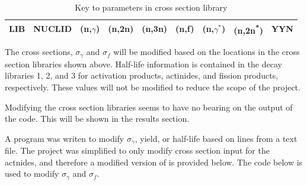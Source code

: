 \documentclass[11pt,notitlepage]{article}
\newcommand{\tss}{\textsuperscript}
\newcommand{\inputdeckpages}[4]{
\begin{itemize}
\item[]
\end{itemize}
}
\begin{document}
\begin{todolist}
  \begin{table}[H]
  \begin{center}
    \caption{Key to parameters in cross section library}
    \label{Table:2}
    \begin{tabular}{l l l l l l l l l}
      \toprule
      LIB & NUCLID & (n,$\gamma$) & (n,2n) & (n,3n) &
      (n,f) & (n,$\gamma^*$) & (n,2n\tss{*}) & YYN\\
      \bottomrule
    \end{tabular}
  \end{center}
  \end{table}

  The cross sections, $\sigma_\gamma$
  and $\sigma_f$ will be modified based on the
  locations in the cross section libraries shown above.
  Half-life information is contained in the decay
  libraries 1, 2, and 3 for activation products, actinides,
  and fission products, respectively. These values will
  not be modified to reduce the scope of the project.

  Modifying the cross section libraries seems to have
  no bearing on the output of the code. This will be shown
  in the results section.

  


  A program was writen to modify $\sigma_\gamma$, yield,
  or half-life based on lines from a text file. The project was
  simplified to only modify cross section input for the actnides,
  and therefore a modified version of is provided below. The code
  below is used to modify $\sigma_\gamma$ and $\sigma_f$.


\end{todolist}
\end{document}

